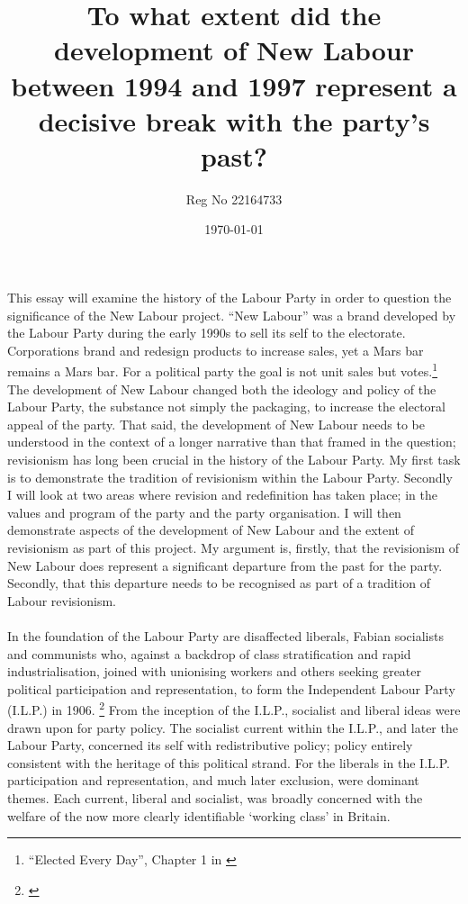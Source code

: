 \documentclass[13pt]{article}
\title{To what extent did the development of New Labour between 1994 and 1997 represent a decisive break with the party's past?}
\author{Reg No 22164733}
\date{\today}
\begin{document}
\begin{onehalfspace}

\maketitle

\paragraph{}This essay will examine the history of the Labour Party in order to question the significance of the New Labour project. ``New Labour'' was a brand developed by the Labour Party during the early 1990s to sell its self to the electorate. Corporations brand and redesign products to increase sales, yet a Mars bar remains a Mars bar. For a political party the goal is not unit sales but votes.\footnote{``Elected Every Day'', Chapter 1 in \cite{Cohen:2003fj}} The development of New Labour changed both the ideology and policy of the Labour Party, the substance not simply the packaging, to increase the electoral appeal of the party. That said, the development of New Labour needs to be understood in the context of a longer narrative than that framed in the question; revisionism has long been crucial in the history of the Labour Party. My first task is to demonstrate the tradition of revisionism within the Labour Party. Secondly I will look at two areas where revision and redefinition has taken place; in the values and program of the party and the party organisation. I will then demonstrate aspects of the development of New Labour and the extent of revisionism as part of this project. My argument is, firstly, that the revisionism of New Labour does represent a significant departure from the past for the party. Secondly, that this departure needs to be recognised as part of a tradition of Labour revisionism.

\paragraph{}In the foundation of the Labour Party are disaffected liberals, Fabian socialists and communists who, against a backdrop of class stratification and rapid industrialisation, joined with unionising workers and others seeking greater political participation and representation, to form the Independent Labour Party (I.L.P.) in 1906. \footnote{\cite{Pelling:1993qy}} From the inception of the I.L.P., socialist and liberal ideas were drawn upon for party policy. The socialist current within the I.L.P., and later the Labour Party, concerned its self with redistributive policy; policy entirely consistent with the heritage of this political strand. For the liberals in the I.L.P. participation and representation, and much later exclusion, were dominant themes. Each current, liberal and socialist, was broadly concerned with the welfare of the now more clearly identifiable `working class' in Britain. 


\end{onehalfspace}
\end{document}

